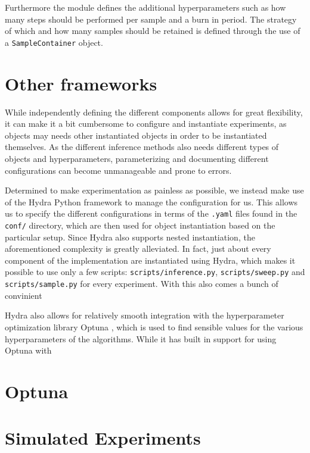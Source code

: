 Furthermore the module defines the additional hyperparameters such as how many steps should be performed per sample and a burn in period.
The strategy of which and how many samples should be retained is defined through the use of a \texttt{SampleContainer} object.

\section{Other frameworks}

While independently defining the different components allows for great flexibility, it can make it a bit cumbersome to configure and instantiate experiments, as objects may needs other instantiated objects in order to be instantiated themselves.
As the different inference methods also needs different types of objects and hyperparameters, parameterizing and documenting different configurations can become unmanageable and prone to errors.

Determined to make experimentation as painless as possible, we instead make use of the Hydra Python framework to manage the configuration for us.  
This allows us to specify the different configurations in terms of the \texttt{.yaml} files found in the \texttt{conf/} directory, which are then used for object instantiation based on the particular setup. 
Since Hydra also supports nested instantiation, the aforementioned complexity is greatly alleviated.
In fact, just about every component of the implementation are instantiated using Hydra, which makes it possible to use only a few scripts: \texttt{scripts/inference.py}, \texttt{scripts/sweep.py} and \texttt{scripts/sample.py} for every experiment. 
With this also comes a bunch of convinient 

Hydra also allows for relatively smooth integration with the hyperparameter optimization library Optuna \cite{akiba_optuna_2019}, which is used to find sensible values for the various hyperparameters of the algorithms.
While it has built in support for using Optuna with 

\section{Optuna}



\section{Simulated Experiments}

